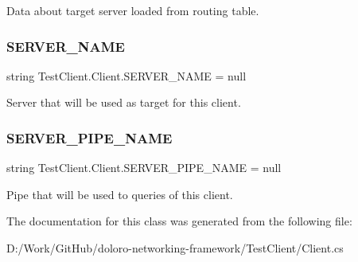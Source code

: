 Data about target server loaded from routing table. 

\mbox{\label{class_test_client_1_1_client_a7fdac87931c97ce7fde6c4fc622bcfa6}} 
\subsubsection{\texorpdfstring{S\+E\+R\+V\+E\+R\+\_\+\+N\+A\+ME}{SERVER\_NAME}}
{\footnotesize\ttfamily string Test\+Client.\+Client.\+S\+E\+R\+V\+E\+R\+\_\+\+N\+A\+ME = null\hspace{0.3cm}{\ttfamily [static]}}



Server that will be used as target for this client. 

\mbox{\label{class_test_client_1_1_client_a58c70d565592caa15b99d9b145a133ea}} 
\subsubsection{\texorpdfstring{S\+E\+R\+V\+E\+R\+\_\+\+P\+I\+P\+E\+\_\+\+N\+A\+ME}{SERVER\_PIPE\_NAME}}
{\footnotesize\ttfamily string Test\+Client.\+Client.\+S\+E\+R\+V\+E\+R\+\_\+\+P\+I\+P\+E\+\_\+\+N\+A\+ME = null\hspace{0.3cm}{\ttfamily [static]}}



Pipe that will be used to queries of this client. 



The documentation for this class was generated from the following file\+:\begin{DoxyCompactItemize}
\item 
D\+:/\+Work/\+Git\+Hub/doloro-\/networking-\/framework/\+Test\+Client/Client.\+cs\end{DoxyCompactItemize}
